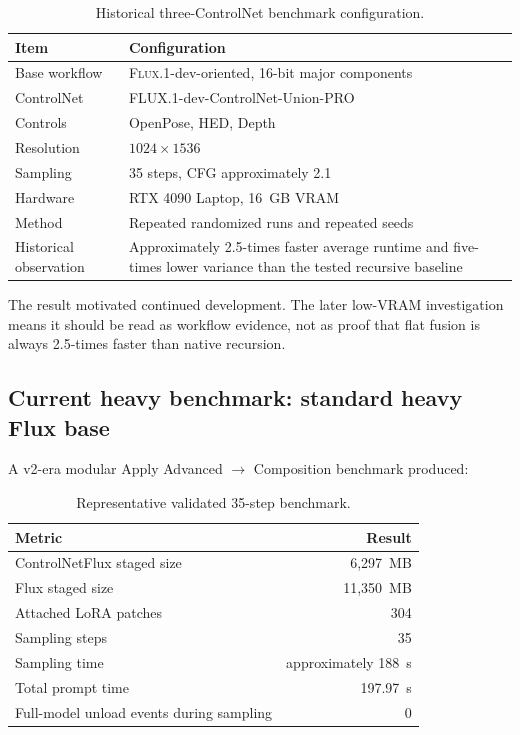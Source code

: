 \documentclass[11pt]{article}
\newcommand{\FluxOne}{\textsc{Flux.1}}
\begin{document}
\begin{table}[H]
\centering
\caption{Historical three-ControlNet benchmark configuration.}
\begin{tabularx}{\textwidth}{@{}lX@{}}
\toprule
Item & Configuration \\
\midrule
Base workflow & \FluxOne{}-dev-oriented, 16-bit major components \\
ControlNet & FLUX.1-dev-ControlNet-Union-PRO \\
Controls & OpenPose, HED, Depth \\
Resolution & $1024\times1536$ \\
Sampling & 35 steps, CFG approximately 2.1 \\
Hardware & RTX 4090 Laptop, 16~GB VRAM \\
Method & Repeated randomized runs and repeated seeds \\
Historical observation & Approximately 2.5-times faster average runtime and five-times lower variance than the tested recursive baseline \\
\bottomrule
\end{tabularx}
\end{table}

The result motivated continued development. The later low-VRAM investigation means it should be read as workflow evidence, not as proof that flat fusion is always 2.5-times faster than native recursion.

\subsection{Current heavy benchmark: standard heavy Flux base}

A v2-era modular Apply Advanced $\rightarrow$ Composition benchmark produced:

\begin{table}[H]
\centering
\caption{Representative validated 35-step benchmark.}
\begin{tabular}{@{}lr@{}}
\toprule
Metric & Result \\
\midrule
ControlNetFlux staged size & 6,297~MB \\
Flux staged size & 11,350~MB \\
Attached LoRA patches & 304 \\
Sampling steps & 35 \\
Sampling time & approximately 188~s \\
Total prompt time & 197.97~s \\
Full-model unload events during sampling & 0 \\
\bottomrule
\end{tabular}
\end{table}
\end{document}
